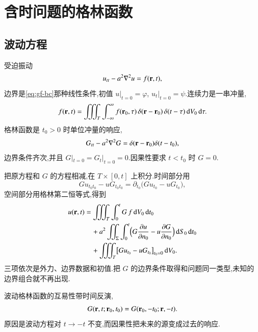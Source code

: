 \section{含时问题的格林函数}

\subsection{波动方程}
受迫振动
\begin{equation}
  u_{tt}-a^2\nabla^2 u=f({\mathbf{r}},t),
\end{equation}
边界是\eqref{eq:gf-bc}那种线性条件,初值 $u|_{t=0}=\varphi$, $u_t|_{t=0}=\psi$.连续力是一串冲量,
\begin{equation}
  f({\mathbf{r}},t)
  =\iiint_{T}\int_{-\infty}^{\infty}
    f({\mathbf{r}}_0,\tau)\,\delta({\mathbf{r}}-{\mathbf{r}}_0)\,\delta(t-\tau)
    \,\mathrm{d}V_0\,\mathrm{d}\tau.
\end{equation}
格林函数是 $t_0>0$ 时单位冲量的响应,
\begin{equation}
  G_{tt}-a^2\nabla^2 G=\delta({\mathbf{r}}-{\mathbf{r}}_0)\delta(t-t_0),
\end{equation}
边界条件齐次,并且 $G|_{t=0}=G_t|_{t=0}=0$.因果性要求 $t<t_0$ 时 $G=0$.

把原方程和 $G$ 的方程相减,在 $T\times[0,t]$ 上积分.时间部分用
\begin{equation}
  G u_{t_0 t_0}-u G_{t_0 t_0}
  =\partial_{t_0}\bigl(G u_{t_0}-u G_{t_0}\bigr),
\end{equation}
空间部分用格林第二恒等式,得到
\begin{equation}
\begin{aligned}
  u({\mathbf{r}},t)
  &=\iiint_{T}\int_0^{t} G\,f\,\mathrm{d}V_0\,\mathrm{d}t_0 \\
  &\quad+a^2\iint_{\Sigma}\int_0^{t}
      \Bigl(G\frac{\partial u}{\partial n_0}-u\frac{\partial G}{\partial n_0}\Bigr)
      \,\mathrm{d}S_0\,\mathrm{d}t_0 \\
  &\quad+\iiint_{T}\bigl[G u_{t_0}-u G_{t_0}\bigr]_{t_0=0}\,\mathrm{d}V_0.
\end{aligned}
\label{eq:gf-wave-rep}
\end{equation}
三项依次是外力、边界数据和初值.把 $G$ 的边界条件取得和问题同一类型,未知的边界组合就不再出现.

波动格林函数的互易性带时间反演,
\begin{equation}
  G({\mathbf{r}},t;{\mathbf{r}}_0,t_0)=G({\mathbf{r}}_0,-t_0;{\mathbf{r}},-t).
\end{equation}
原因是波动方程对 $t\to -t$ 不变,而因果性把未来的源变成过去的响应.

